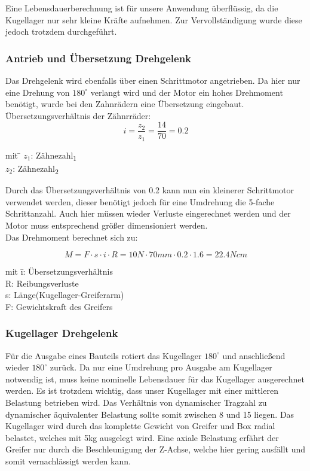 Eine Lebensdauerberechnung ist für unsere Anwendung überflüssig, da die Kugellager nur sehr kleine Kräfte aufnehmen.
Zur Vervollständigung wurde diese jedoch trotzdem durchgeführt.



\subsubsection{Antrieb und Übersetzung Drehgelenk}

Das Drehgelenk wird ebenfalls über einen Schrittmotor angetrieben. Da hier nur eine Drehung von $180^\circ$ verlangt wird und der Motor ein hohes Drehmoment benötigt, wurde bei den Zahnrädern eine Übersetzung eingebaut.\\


Übersetzungsverhältnis der Zähnrräder:
\[i=\frac{z_2}{z_1}=\frac{14}{70}=0.2\]	

\begin{tabbing}
mit \= $z_1$: Zähnezahl\textsubscript{1} \\
    \> $z_2$: Zähnezahl\textsubscript{2} \\
\end{tabbing}

Durch das Übersetzungsverhältnis von 0.2 kann nun ein kleinerer Schrittmotor verwendet werden, dieser benötigt jedoch für eine Umdrehung die 5-fache Schrittanzahl. Auch hier müssen wieder Verluste eingerechnet werden und der Motor muss entsprechend größer dimensioniert werden.\\


Das Drehmoment berechnet sich zu:

\[M=F\cdot s\cdot i\cdot R = 10N\cdot  70mm\cdot 0.2\cdot 1.6 = 22.4Ncm\]

\begin{tabbing}
mit \= i: Übersetzungsverhältnis\\
    \> R: Reibungsverluste \\
		\> s: Länge(Kugellager-Greiferarm)\\
		\> F: Gewichtskraft des Greifers\\
\end{tabbing}





\subsubsection{Kugellager Drehgelenk}

Für die Ausgabe eines Bauteils rotiert das Kugellager $180^\circ$ und anschließend wieder $180^\circ$ zurück. Da nur eine Umdrehung pro Ausgabe am Kugellager notwendig ist, muss keine nominelle Lebensdauer für das Kugellager ausgerechnet werden. Es ist trotzdem wichtig, dass unser Kugellager mit einer mittleren Belastung betrieben wird. Das Verhältnis von dynamischer Tragzahl zu dynamischer äquivalenter Belastung sollte somit zwischen 8 und 15 liegen. Das Kugellager wird durch das komplette Gewicht von Greifer und Box radial belastet, welches mit 5kg ausgelegt wird. Eine axiale Belastung erfährt der Greifer nur durch die Beschleunigung der Z-Achse, welche hier gering ausfällt und somit vernachlässigt werden kann. 

